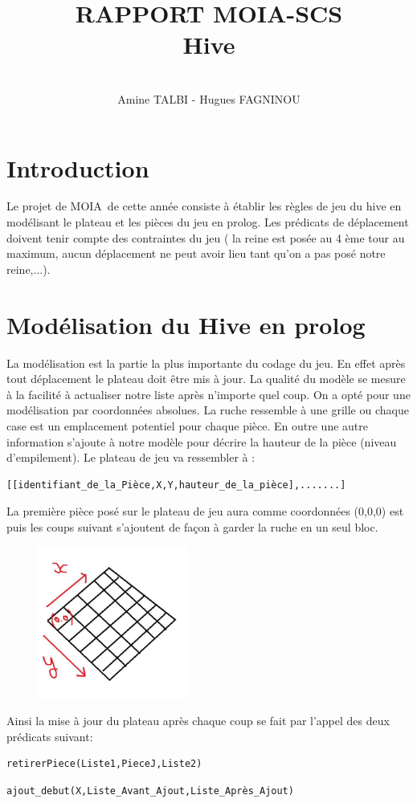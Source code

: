 \documentclass[a4paper,10pt]{article}
\title{RAPPORT MOIA-SCS\\
            Hive}
\author{\\Amine TALBI - Hugues FAGNINOU}
\begin{document}
\maketitle
\newpage
\tableofcontents
\newpage
\section{Introduction} 
Le projet de MOIA de cette année consiste à établir les règles de jeu du hive en
modélisant le plateau et 
les pièces du jeu en prolog. Les prédicats de déplacement doivent tenir compte
des contraintes du jeu (
la reine est posée au 4 ème tour au maximum, aucun déplacement ne peut avoir
lieu tant qu'on a pas posé notre
reine,...).
\section{Modélisation du Hive en prolog}
La modélisation est la partie la plus importante du codage du jeu. En effet après tout déplacement le plateau doit être 
mis à jour. La qualité du modèle se mesure à la facilité à actualiser notre
liste après n'importe quel coup.
On a opté pour une modélisation par coordonnées absolues. La ruche ressemble à
une grille ou chaque case est
un emplacement potentiel pour chaque pièce. En outre une autre information s'ajoute à notre modèle pour décrire la hauteur
de la pièce (niveau d'empilement).
Le plateau de jeu va ressembler à :                                            
\begin{verbatim}[[identifiant_de_la_Pièce,X,Y,hauteur_de_la_pièce],.......]
\end{verbatim}
La première pièce posé sur le plateau de jeu aura comme coordonnées (0,0,0) est
puis les coups suivant s'ajoutent 
de façon à garder la ruche en un seul bloc.
\begin{center}
 \includegraphics[width=7cm,height=50mm]{testrl.jpg}
\end{center}
Ainsi la mise à jour du plateau après chaque coup se fait par l'appel des 
deux prédicats suivant:
\begin{verbatim}retirerPiece(Liste1,PieceJ,Liste2)\end{verbatim}
\begin{verbatim}ajout_debut(X,Liste_Avant_Ajout,Liste_Après_Ajout)\end{verbatim}
\end{document}
